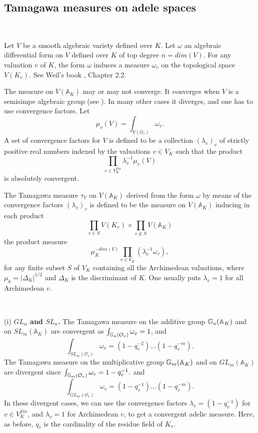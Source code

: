 \documentclass[12pt]{amsart}
\def\A{\mathbb{A}}
\def\cL{\mathcal{L}}
\def\cL{\mathcal{L}}
\numberwithin{equation}{section}
\begin{document}

\medskip

\subsection{\bf Tamagawa measures on adele spaces}\label{ssec-tam} 

\

\medskip

Let $V$ be a smooth algebraic variety defined over $K$. 
Let $\omega$ an algebraic differential form on $V$ defined over $K$ of top degree $n=dim(V)$. 
For any valuation $v$ of $K$, the form $\omega$ induces a measure $\omega_v$ on the topological space $V(K_v)$. See Weil's book \cite{weil-adeles-gps}, Chapter 2.2.
 
The measure on $V(\A_K)$ may or may not converge. It converges when $V$ is a semisimpe algebraic group (see \cite{weil-adeles-gps}). In many other cases it diverges, and one has to use convergence factors. 
Let $$\mu_v(V)=\int_{V(\mathcal{O}_v)} \omega_v.$$
A set of convergence factors for $V$ is defined to be a collection $(\lambda_v)_v$ of strictly positive real numbers indexed by the valuations $v\in V_K$ such that the 
product $$\prod_{v\in V_K^{fin}} \lambda_v^{-1} \mu_v(V)$$ is absolutely convergent.

The Tamagawa measure $\tau_V$ on $V(\A_K)$ derived from the form $\omega$ by means of the convergence factors $(\lambda_v)_v$ is defined to be the measure on $V(\A_K)$ inducing in each product
$$\prod_{v\in S} V(K_v) \times \prod_{v\notin S} V(\A_K)$$
the product measure 
$$\mu_K^{-dim(V)} \prod_{v\in V_K} (\lambda_v^{-1}\omega_v),$$
for any finite subset $S$ of $V_K$ containing all the 
Archimedean valuations, where $\mu_k=|\Delta_K|^{1/2}$ and $\Delta_K$ is the discriminant of $K$. One usually puts $\lambda_v=1$ for all Archimedean $v$.

\

(i) {\bf $GL_n$ and $SL_n$.} The Tamagawa measure on the additive group $\Bbb G_a(\A_K)$ and on $SL_m(\A_K)$ are convergent as 
$\int_{\Bbb G_a(\mathcal{O}_v)} \omega_v=1$, and 
$$\int_{SL_m(\mathcal{O}_v)} \omega_v=(1-q_v^{-2})\dots (1-q_v^{-m}).$$
The Tamagawa measure on the multiplicative group $\Bbb G_m(\A_K)$ and on $GL_m(\A_K)$ are divergent since
$\int_{\Bbb G_m(\mathcal{O}_v)} \omega_v=1-q_v^{-1}.$ and 
$$\int_{GL_m(\mathcal{O}_v)} \omega_v=(1-q_v^{-1})\dots (1-q_v^{-m}).$$
In these divergent cases, we can use the convergence factors $\lambda_v=(1-q_v^{-1})$ for $v\in V_K^{fin}$, 
and $\lambda_v=1$ for Archimedean $v$, to get a convergent adelic measure. Here, as before, $q_v$ is the cardinality of the residue field of $K_v$.
\end{document}
